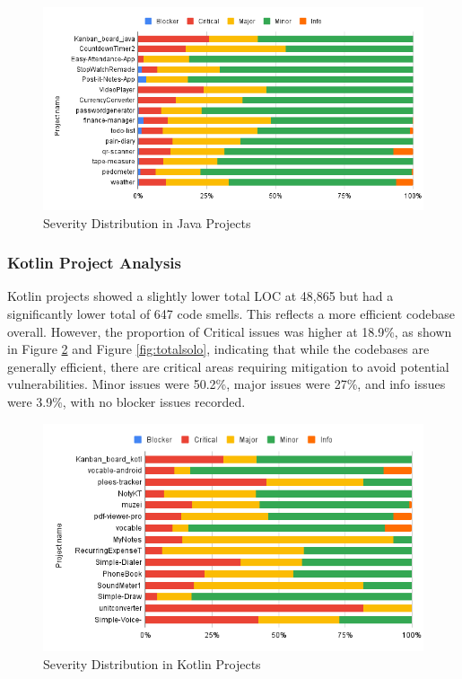 \begin{figure}[htbp]
    \centering
    \includegraphics[scale = 0.58]{img/JAVASOLO.png}
    \caption{Severity Distribution in Java Projects}
    \label{fig:javasolo}
\end{figure}

\subsubsection{Kotlin Project Analysis}
Kotlin projects showed a slightly lower total LOC at 48,865 but had a significantly lower total of 647 code smells. This reflects a more efficient codebase overall. However, the proportion of Critical issues was higher at 18.9\%, as shown in Figure \ref*{fig:kotlinsolo} and Figure \ref*{fig:totalsolo}, indicating that while the codebases are generally efficient, there are critical areas requiring mitigation to avoid potential vulnerabilities. Minor issues were 50.2\%, major issues were 27\%, and info issues were 3.9\%, with no blocker issues recorded.


\begin{figure}[htbp]
    \centering
    \includegraphics[scale = 0.58]{img/KOTLINSOLO.png}
    \caption{Severity Distribution in Kotlin Projects}
    \label{fig:kotlinsolo}
\end{figure}

